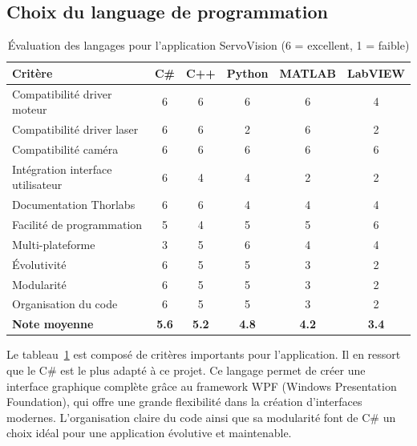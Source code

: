 \subsection{Choix du language de programmation}
\begin{table}[H]
    \centering
    \begin{tabular}{|l|c|c|c|c|c|}
        \hline
        \textbf{Critère}                  & \textbf{C\#} & \textbf{C++} & \textbf{Python} & \textbf{MATLAB} & \textbf{LabVIEW} \\
        \hline
        Compatibilité driver moteur       & 6            & 6            & 6               & 6               & 4                \\
        Compatibilité driver laser        & 6            & 6            & 2               & 6               & 2                \\
        Compatibilité caméra              & 6            & 6            & 6               & 6               & 6                \\
        Intégration interface utilisateur & 6            & 4            & 4               & 2               & 2                \\
        Documentation Thorlabs            & 6            & 6            & 4               & 4               & 4                \\
        Facilité de programmation         & 5            & 4            & 5               & 5               & 6                \\
        Multi-plateforme                  & 3            & 5            & 6               & 4               & 4                \\
        Évolutivité                       & 6            & 5            & 5               & 3               & 2                \\
        Modularité                        & 6            & 5            & 5               & 3               & 2                \\
        Organisation du code              & 6            & 5            & 5               & 3               & 2                \\
        \hline
        \textbf{Note moyenne}             & \textbf{5.6} & \textbf{5.2} & \textbf{4.8}    & \textbf{4.2}    & \textbf{3.4}     \\
        \hline
    \end{tabular}
    \caption{Évaluation des langages pour l'application ServoVision (6 = excellent, 1 = faible)}
    \label{tab:langages}
\end{table}
Le tableau~\ref{tab:langages} est composé de critères importants pour l'application. Il en ressort que le C\# est le plus adapté à ce projet. Ce langage permet de créer une interface graphique complète grâce au framework WPF (Windows Presentation Foundation), qui offre une grande flexibilité dans la création d'interfaces modernes. L'organisation claire du code ainsi que sa modularité font de C\# un choix idéal pour une application évolutive et maintenable.

